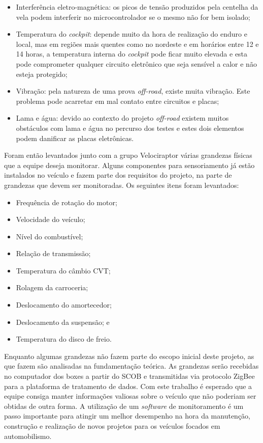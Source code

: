 \begin{itemize}
	\item  Interferência eletro-magnética: os picos de tensão produzidos pela centelha da vela podem interferir no microcontrolador se o mesmo não for bem isolado; 
	\item Temperatura do \textit{cockpit}: depende muito da hora de realização do enduro e local, mas em regiões mais quentes como no nordeste e em horários entre 12 e 14 horas, a temperatura interna do \textit{cockpit} pode ficar muito elevada e esta pode comprometer qualquer circuito eletrônico que seja sensível a calor e não esteja protegido; 
	\item Vibração: pela natureza de uma prova \textit{off-road}, existe muita vibração. Este problema pode acarretar em mal contato entre circuitos e placas;
	\item Lama e água: devido ao contexto do projeto \textit{off-road} existem muitos obstáculos com lama e água no percurso dos testes e estes dois elementos podem danificar as placas eletrônicas.
\end{itemize}

Foram então levantados junto com a grupo Velociraptor várias grandezas físicas que a equipe deseja monitorar. Alguns componentes para sensoriamento já estão instalados no veículo e fazem parte dos requisitos do projeto, na parte de grandezas que devem ser monitoradas. Os seguintes itens foram levantados: 

\begin{itemize}
	\item Frequência de rotação do motor;
	\item Velocidade do veículo;
	\item Nível do combustível;
	\item Relação de transmissão;
	\item Temperatura do câmbio CVT;
	\item Rolagem da carroceria;
	\item Deslocamento do amortecedor;
	\item Deslocamento da suspensão; e
	\item Temperatura do disco de freio.
\end{itemize}

Enquanto algumas grandezas não fazem parte do escopo inicial deste projeto, as que fazem são analisadas na fundamentação teórica. As grandezas serão recebidas no computador dos boxes a partir do SCOB e transmitidas via protocolo ZigBee para a plataforma de tratamento de dados. Com este trabalho é esperado que a equipe consiga manter informações valiosas sobre o veículo que não poderiam ser obtidas de outra forma. A utilização de um \textit{software} de monitoramento é um passo importante para atingir um melhor desempenho na hora da manutenção, construção e realização de novos projetos para os veículos focados em automobilismo.   


